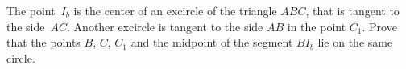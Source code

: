 \problem
\label{2014/en/team/senior/3:problem}%
The point~$I_b$ is the center of an excircle of the triangle $ABC$, that
is tangent to the side~$AC$.
Another excircle is tangent to the side $AB$ in the point $C_1$.
Prove that the points $B$, $C$, $C_1$ and the midpoint of the segment $B I_b$
lie on the same circle.
\solution
\endproblem
